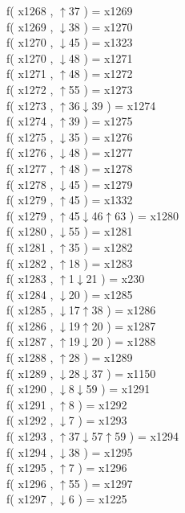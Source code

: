 f( x1268 , $\uparrow$37 ) = x1269 \\
f( x1269 , $\downarrow$38 ) = x1270 \\
f( x1270 , $\downarrow$45 ) = x1323 \\
f( x1270 , $\downarrow$48 ) = x1271 \\
f( x1271 , $\uparrow$48 ) = x1272 \\
f( x1272 , $\uparrow$55 ) = x1273 \\
f( x1273 , $\uparrow$36$\downarrow$39 ) = x1274 \\
f( x1274 , $\uparrow$39 ) = x1275 \\
f( x1275 , $\downarrow$35 ) = x1276 \\
f( x1276 , $\downarrow$48 ) = x1277 \\
f( x1277 , $\uparrow$48 ) = x1278 \\
f( x1278 , $\downarrow$45 ) = x1279 \\
f( x1279 , $\uparrow$45 ) = x1332 \\
f( x1279 , $\uparrow$45$\downarrow$46$\uparrow$63 ) = x1280 \\
f( x1280 , $\downarrow$55 ) = x1281 \\
f( x1281 , $\uparrow$35 ) = x1282 \\
f( x1282 , $\uparrow$18 ) = x1283 \\
f( x1283 , $\uparrow$1$\downarrow$21 ) = x230 \\
f( x1284 , $\downarrow$20 ) = x1285 \\
f( x1285 , $\downarrow$17$\uparrow$38 ) = x1286 \\
f( x1286 , $\downarrow$19$\uparrow$20 ) = x1287 \\
f( x1287 , $\uparrow$19$\downarrow$20 ) = x1288 \\
f( x1288 , $\uparrow$28 ) = x1289 \\
f( x1289 , $\downarrow$28$\downarrow$37 ) = x1150 \\
f( x1290 , $\downarrow$8$\downarrow$59 ) = x1291 \\
f( x1291 , $\uparrow$8 ) = x1292 \\
f( x1292 , $\downarrow$7 ) = x1293 \\
f( x1293 , $\uparrow$37$\downarrow$57$\uparrow$59 ) = x1294 \\
f( x1294 , $\downarrow$38 ) = x1295 \\
f( x1295 , $\uparrow$7 ) = x1296 \\
f( x1296 , $\uparrow$55 ) = x1297 \\
f( x1297 , $\downarrow$6 ) = x1225 \\
